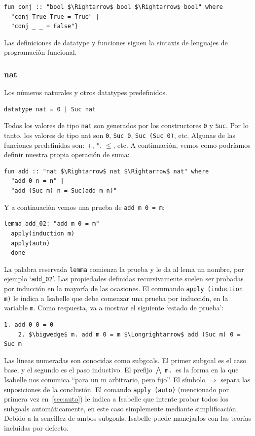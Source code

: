 \documentclass[12pt]{book}
\begin{document}
\begin{lstlisting}[style=Isabelle]
  fun conj :: "bool $\Rightarrow$ bool $\Rightarrow$ bool" where
  "conj True True = True" |
  "conj _ _ = False"}
\end{lstlisting}

Las definiciones de datatype y funciones siguen la sintaxis de lenguajes de programación funcional.

\subsubsection{nat}
Los números naturales y otros datatypes predefinidos.

\begin{lstlisting}[style=Isabelle]
datatype nat = 0 | Suc nat
\end{lstlisting}

Todos los valores de tipo \texttt{nat} son generados por los constructores \texttt{0} y \texttt{Suc}. Por lo tanto, los valores de tipo nat son \texttt{0}, \texttt{Suc 0}, \texttt{Suc (Suc 0)}, etc. Algunas de las funciones predefinidas son: +, *, $\leq$, etc. A continuación, vemos como podríamos definir nuestra propia operación de suma:

\begin{lstlisting}[style=Isabelle]
  fun add :: "nat $\Rightarrow$ nat $\Rightarrow$ nat" where
  "add 0 n = n" |
  "add (Suc m) n = Suc(add m n)"
\end{lstlisting}

Y a continuación vemos una prueba de \texttt{add m 0 = m}:
\begin{lstlisting}[style=Isabelle]
  lemma add_02: "add m 0 = m"
  apply(induction m)
  apply(auto)	  
  done
\end{lstlisting}

La palabra reservada \texttt{lemma} comienza la prueba y le da al lema un nombre, por ejemplo `\texttt{add\_02}'. Las propiedades definidas recursivamente suelen ser probadas por inducción en la mayoría de las ocasiones. El commando \texttt{apply (induction m)} le indica a Isabelle que debe comenzar una prueba por inducción, en la variable \texttt{m}. Como respuesta, va a mostrar el siguiente `estado de prueba':

\begin{lstlisting}[style=Isabelle]
	1. add 0 0 = 0
	2. $\bigwedge$ m. add m 0 = m $\Longrightarrow$ add (Suc m) 0 = Suc m	
\end{lstlisting}

Las lineas numeradas son conocidas como subgoals. El primer subgoal es el caso base, y el segundo es el paso inductivo. El prefijo $\bigwedge$ \texttt{m. }es la forma en la que Isabelle nos comunica ``para un m arbitrario, pero fijo''. El símbolo $\Longrightarrow$ separa las suposiciones de la conclusión. El comando \texttt{apply (auto)} (mencionado por primera vez en~\ref{sec:auto}) le indica a Isabelle que intente probar todos los subgoals automáticamente, en este caso simplemente mediante simplificación. Debido a la sencillez de ambos subgoals, Isabelle puede manejarlos con las teorías incluidas por defecto. 
\end{document}
